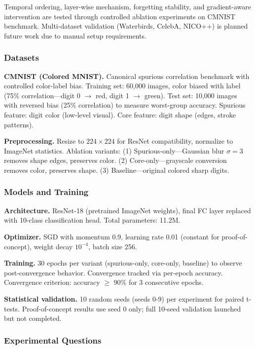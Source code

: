 
Temporal ordering, layer-wise mechanism, forgetting stability, and gradient-aware intervention are tested through controlled ablation experiments on CMNIST benchmark. Multi-dataset validation (Waterbirds, CelebA, NICO++) is planned future work due to manual setup requirements.

\subsubsection{Datasets}

\textbf{CMNIST (Colored MNIST).} Canonical spurious correlation benchmark with controlled color-label bias. Training set: 60,000 images, color biased with label (75\% correlation---digit 0 $\rightarrow$ red, digit 1 $\rightarrow$ green). Test set: 10,000 images with reversed bias (25\% correlation) to measure worst-group accuracy. Spurious feature: digit color (low-level visual). Core feature: digit shape (edges, stroke patterns).

\textbf{Preprocessing.} Resize to $224\times 224$ for ResNet compatibility, normalize to ImageNet statistics. Ablation variants: (1) Spurious-only---Gaussian blur $\sigma =3$ removes shape edges, preserves color. (2) Core-only---grayscale conversion removes color, preserves shape. (3) Baseline---original colored sharp digits.

\subsubsection{Models and Training}

\textbf{Architecture.} ResNet-18 (pretrained ImageNet weights), final FC layer replaced with 10-class classification head. Total parameters: 11.2M.

\textbf{Optimizer.} SGD with momentum 0.9, learning rate 0.01 (constant for proof-of-concept), weight decay $10^{-4}$, batch size 256.

\textbf{Training.} 30 epochs per variant (spurious-only, core-only, baseline) to observe post-convergence behavior. Convergence tracked via per-epoch accuracy. Convergence criterion: accuracy $\geq$ 90\% for 3 consecutive epochs.

\textbf{Statistical validation.} 10 random seeds (seeds 0-9) per experiment for paired t-tests. Proof-of-concept results use seed 0 only; full 10-seed validation launched but not completed.

\subsubsection{Experimental Questions}

